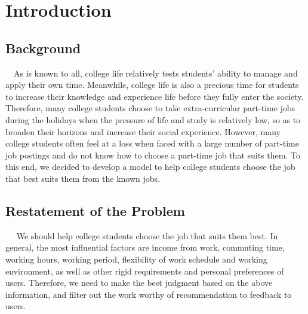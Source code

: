 \documentclass[12pt]{article}
\begin{document}
\pagestyle{fancy}\fancyhf{}\setcounter{page}{1} %
\tableofcontents\thispagestyle{empty}\newpage

\setcounter{page}{1} %
\section{Introduction}
\subsection{Background}
~~As is known to all, college life relatively tests students' ability to manage and apply their own time. Meanwhile, college life is also a precious time for students to increase their knowledge and experience life before they fully enter the society. Therefore, many college students choose to take extra-curricular part-time jobs during the holidays when the pressure of life and study is relatively low, so as to broaden their horizons and increase their social experience. However, many college students often feel at a loss when faced with a large number of part-time job postings and do not know how to choose a part-time job that suits them. To this end, we decided to develop a model to help college students choose the job that best suits them from the known jobs.
\subsection{Restatement of the Problem}
~~
We should help college students choose the job that suits them best. In general, the most influential factors are income from work, commuting time, working hours, working period, flexibility of work schedule and working environment, as well as other rigid requirements and personal preferences of users. Therefore, we need to make the best judgment based on the above information, and filter out the work worthy of recommendation to feedback to users.
\end{document}
